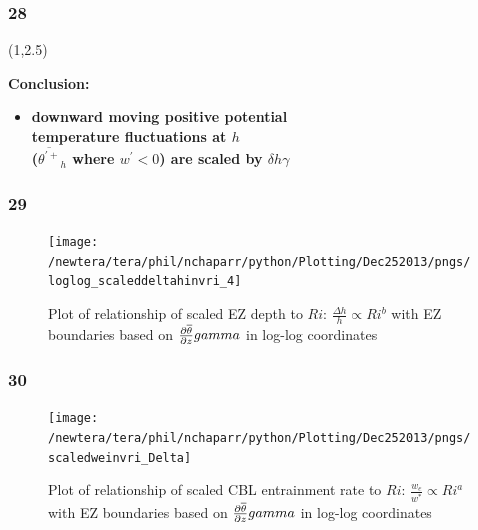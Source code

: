 \documentclass{beamer}
\newcommand\FrameText[1]{
\begin{textblock}{16}(1,2.5)
\raggedright #1
\end{textblock}}
\begin{document}
\begin{frame}
\frametitle{28}
\FrameText{\bf{\Large Conclusion:}
\vspace{5mm}
\begin{itemize}
\item \bf{\Large downward moving positive potential \\

temperature fluctuations at $h$ \\

($\overline{\theta^{'+}}_{h}$ where $w^{'}<0$) are scaled by $\delta h \gamma$}
\end{itemize}
}
\end{frame}

\begin{frame}
\frametitle{29}
\fontsize{12pt}{7.2}\selectfont
\vspace{3mm}
\begin{figure}
\centering
\texttt{[image: /newtera/tera/phil/nchaparr/python/Plotting/Dec252013/pngs/loglog\_scaleddeltahinvri\_4]}
\caption{Plot of relationship of scaled EZ depth to $Ri$: $\frac{\Delta h}{h} \propto Ri ^{b}$ with EZ boundaries based on $\frac{\partial \overline{\theta}}{\partial z}\/gamma$ in log-log coordinates}
\end{figure}
\end{frame}

\begin{frame}
\frametitle{30}
\fontsize{12pt}{7.2}\selectfont
\begin{figure}
\vspace{3mm}
\texttt{[image: /newtera/tera/phil/nchaparr/python/Plotting/Dec252013/pngs/scaledweinvri\_Delta]}
\caption{Plot of relationship of scaled CBL entrainment rate to $Ri$: $\frac{w_{e}}{w^{*}} \propto  Ri^{a}$ with EZ boundaries based on $\frac{\partial \overline{\theta}}{\partial z}\/gamma$ in log-log coordinates}
\end{figure}
\end{frame}
\end{document}
